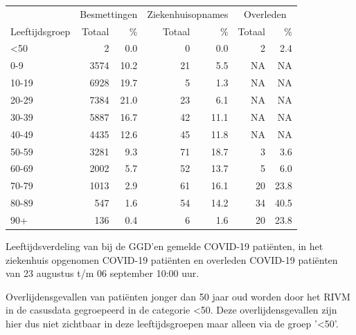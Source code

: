 \documentclass[
  english,
  man,floatsintext]{apa6}
\begin{document}
\begin{table}
\centering\begingroup\fontsize{11}{13}\selectfont

\begin{threeparttable}
\begin{tabular}{lrrrrrr}
\toprule
\multicolumn{1}{c}{ } & \multicolumn{2}{c}{Besmettingen} & \multicolumn{2}{c}{Ziekenhuisopnames} & \multicolumn{2}{c}{Overleden} \\
\cmidrule(l{3pt}r{3pt}){2-3} \cmidrule(l{3pt}r{3pt}){4-5} \cmidrule(l{3pt}r{3pt}){6-7}
Leeftijdsgroep & Totaal & \% & Totaal & \% & Totaal & \%\\
\midrule
<50 & 2 & 0.0 & 0 & 0.0 & 2 & 2.4\\
0-9 & 3574 & 10.2 & 21 & 5.5 & NA & NA\\
10-19 & 6928 & 19.7 & 5 & 1.3 & NA & NA\\
20-29 & 7384 & 21.0 & 23 & 6.1 & NA & NA\\
30-39 & 5887 & 16.7 & 42 & 11.1 & NA & NA\\
40-49 & 4435 & 12.6 & 45 & 11.8 & NA & NA\\
50-59 & 3281 & 9.3 & 71 & 18.7 & 3 & 3.6\\
60-69 & 2002 & 5.7 & 52 & 13.7 & 5 & 6.0\\
70-79 & 1013 & 2.9 & 61 & 16.1 & 20 & 23.8\\
80-89 & 547 & 1.6 & 54 & 14.2 & 34 & 40.5\\
90+ & 136 & 0.4 & 6 & 1.6 & 20 & 23.8\\
\bottomrule
\end{tabular}
\begin{tablenotes}
\item[1] Leeftijdsverdeling van bij de GGD’en gemelde COVID-19 patiënten, in het ziekenhuis opgenomen COVID-19 patiënten en overleden COVID-19 patiënten van 23 augustus t/m 06 september 10:00 uur.
\item[2] Overlijdensgevallen van patiënten jonger dan 50 jaar oud worden door het RIVM in de casusdata gegroepeerd in de categorie <50. Deze overlijdensgevallen zijn hier dus niet zichtbaar in deze leeftijdsgroepen maar alleen via de groep '<50'.
\end{tablenotes}
\end{threeparttable}
\endgroup{}
\end{table}

\newpage
\end{document}
